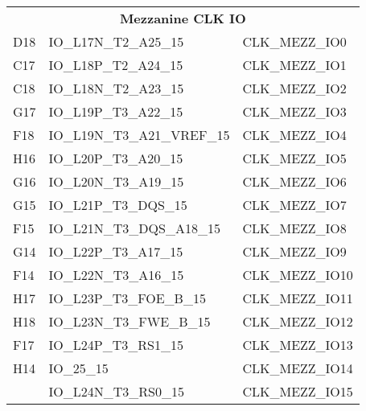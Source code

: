 \begin{footnotesize}
	\begin{longtable}{|l|p{6cm}|p{6cm}|}
		\hline
		\multicolumn{3}{|c|}{\multirow{2}{*}{\textbf{\large{Mezzanine CLK IO}}}}\\
		\multicolumn{3}{|c|}{} \\ \hline 
D18	&	IO\_L17N\_T2\_A25\_15	&	CLK\_MEZZ\_IO0	\\ \hline
C17	&	IO\_L18P\_T2\_A24\_15	&	CLK\_MEZZ\_IO1	\\ \hline
C18	&	IO\_L18N\_T2\_A23\_15	&	CLK\_MEZZ\_IO2	\\ \hline
G17	&	IO\_L19P\_T3\_A22\_15	&	CLK\_MEZZ\_IO3	\\ \hline
F18	&	IO\_L19N\_T3\_A21\_VREF\_15	&	CLK\_MEZZ\_IO4	\\ \hline
H16	&	IO\_L20P\_T3\_A20\_15	&	CLK\_MEZZ\_IO5	\\ \hline
G16	&	IO\_L20N\_T3\_A19\_15	&	CLK\_MEZZ\_IO6	\\ \hline
G15	&	IO\_L21P\_T3\_DQS\_15	&	CLK\_MEZZ\_IO7	\\ \hline
F15	&	IO\_L21N\_T3\_DQS\_A18\_15	&	CLK\_MEZZ\_IO8	\\ \hline
G14	&	IO\_L22P\_T3\_A17\_15	&	CLK\_MEZZ\_IO9	\\ \hline
F14	&	IO\_L22N\_T3\_A16\_15	&	CLK\_MEZZ\_IO10	\\ \hline
H17	&	IO\_L23P\_T3\_FOE\_B\_15	&	CLK\_MEZZ\_IO11	\\ \hline
H18	&	IO\_L23N\_T3\_FWE\_B\_15	&	CLK\_MEZZ\_IO12	\\ \hline
F17	&	IO\_L24P\_T3\_RS1\_15	&	CLK\_MEZZ\_IO13	\\ \hline
H14	&	IO\_25\_15	&	CLK\_MEZZ\_IO14	\\ \hline
&	IO\_L24N\_T3\_RS0\_15	&	CLK\_MEZZ\_IO15	\\ \hline

		
		
	\end{longtable}
\end{footnotesize}